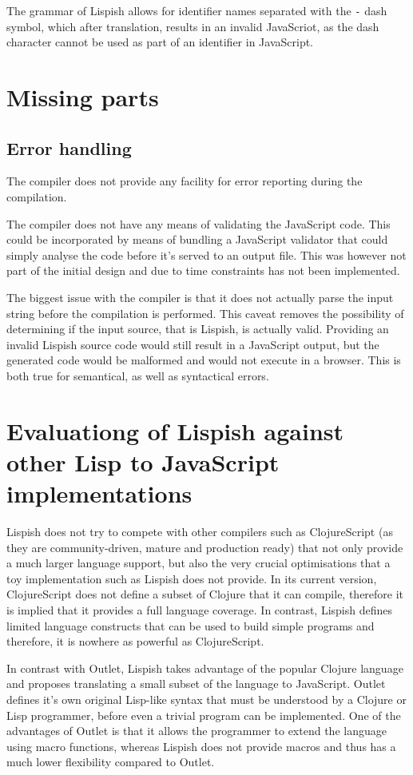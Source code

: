 The grammar of Lispish allows for identifier names separated with the \texttt{-} dash symbol, which after translation, results in an invalid JavaScriot, as the dash character cannot be used as part of an identifier in JavaScript.

\section{Missing parts}
\subsection{Error handling}
The compiler does not provide any facility for error reporting during the compilation.

The compiler does not have any means of validating the JavaScript code. This could be incorporated by means of bundling a JavaScript validator that could simply analyse the code before it's served to an output file. This was however not part of the initial design and due to time constraints has not been implemented.

The biggest issue with the compiler is that it does not actually parse the input string before the compilation is performed. This caveat removes the possibility of determining if the input source, that is Lispish, is actually valid. 
Providing an invalid Lispish source code would still result in a JavaScript output, but the generated code would be malformed and would not execute in a browser. This is both true for semantical, as well as syntactical errors.

\section{Evaluationg of Lispish against other Lisp to JavaScript implementations}\label{lispish-vs-rest}

Lispish does not try to compete with other compilers such as ClojureScript (as they are community-driven, mature and production ready) that not only provide a much larger language support, but also the very crucial optimisations that a toy implementation such as Lispish does not provide. 
In its current version, ClojureScript does not define a subset of Clojure that it can compile, therefore it is implied that it provides a full language coverage. In contrast, Lispish defines limited language constructs that can be used to build simple programs and therefore, it is nowhere as powerful as ClojureScript.

In contrast with Outlet, Lispish takes advantage of the popular Clojure language and proposes translating a small subset of the language to JavaScript. Outlet defines it's own original Lisp-like syntax that must be understood by a Clojure or Lisp programmer, before even a trivial program can be implemented.
One of the advantages of Outlet is that it allows the programmer to extend the language using macro functions, whereas Lispish does not provide macros and thus has a much lower flexibility compared to Outlet. 

